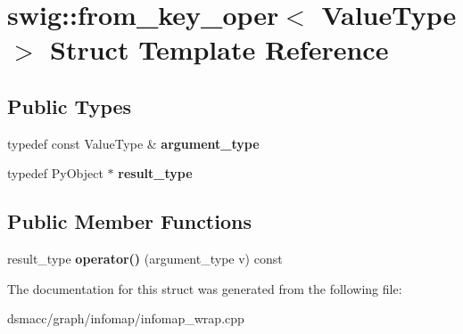 \hypertarget{structswig_1_1from__key__oper}{}\section{swig\+:\+:from\+\_\+key\+\_\+oper$<$ Value\+Type $>$ Struct Template Reference}
\label{structswig_1_1from__key__oper}
\subsection*{Public Types}
\begin{DoxyCompactItemize}
\item 
\mbox{\label{structswig_1_1from__key__oper_a215e6c79db4b71c9aa22b77c4e420669}} 
typedef const Value\+Type \& {\bfseries argument\+\_\+type}
\item 
\mbox{\label{structswig_1_1from__key__oper_ae5b8af422665141a9736faf34791725b}} 
typedef Py\+Object $\ast$ {\bfseries result\+\_\+type}
\end{DoxyCompactItemize}
\subsection*{Public Member Functions}
\begin{DoxyCompactItemize}
\item 
\mbox{\label{structswig_1_1from__key__oper_a9af820e2d76f2830f57ae922c1ce908b}} 
result\+\_\+type {\bfseries operator()} (argument\+\_\+type v) const
\end{DoxyCompactItemize}


The documentation for this struct was generated from the following file\+:\begin{DoxyCompactItemize}
\item 
dsmacc/graph/infomap/infomap\+\_\+wrap.\+cpp\end{DoxyCompactItemize}
